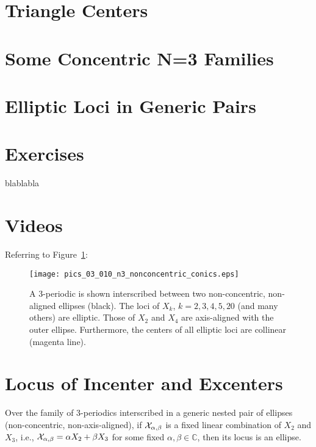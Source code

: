 \section{Triangle Centers}

\section{Some Concentric N=3 Families}

\section{Elliptic Loci in Generic Pairs}

\section{Exercises}

\begin{exercise}
blablabla
\end{exercise}

\section{Videos}


Referring to Figure~\ref{fig:nonconcentric-xns}:

\begin{figure}
     \centering
     \texttt{[image: pics\_03\_010\_n3\_nonconcentric\_conics.eps]}
     \caption{A 3-periodic is shown interscribed between two non-concentric, non-aligned ellipses (black). The loci of $X_k$, $k=2,3,4,5,20$ (and many others) are elliptic. Those of $X_2$ and $X_4$ are axis-aligned with the outer ellipse. Furthermore, the centers of all elliptic loci are collinear (magenta line).}
     \label{fig:nonconcentric-xns}
 \end{figure}
 
\section{Locus of Incenter and Excenters}\label{sec:inc_excenter}

\begin{theorem}
Over the family of 3-periodics interscribed in a generic nested pair of ellipses (non-concentric, non-axis-aligned),
if $\mathcal{X}_{\alpha,\beta}$ is a fixed linear combination of $X_2$ and $X_3$, i.e., $\mathcal{X}_{\alpha,\beta}=\alpha X_2+\beta X_3$ for some fixed $\alpha,\beta\in\mathbb{C}$, then its locus is an ellipse. 
\label{thm:ellipse-locus}
\end{theorem}


